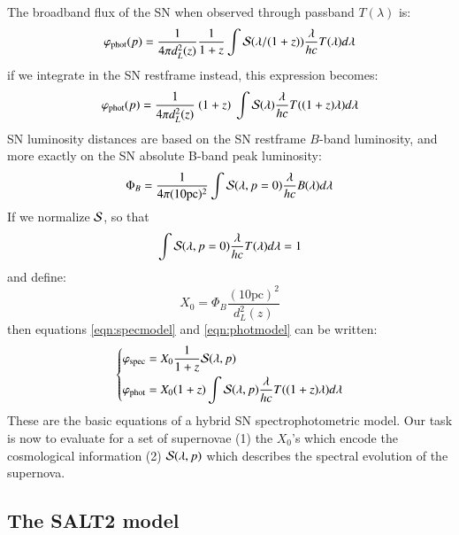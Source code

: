\documentclass{aa}
\begin{document}
The broadband flux of the SN when observed through passband
$T(\lambda)$ is:
\begin{equation}
  \varphi_{\mathrm{phot}}(p) = \frac{1}{4\pi d_L^2(z)} \frac{1}{1+z} \int {\cal S}(\lambda/(1+z)) \frac{\lambda}{hc} T(\lambda) d\lambda
\end{equation}
if we integrate in the SN restframe instead, this expression becomes:
\begin{equation}
  \varphi_{\mathrm{phot}}(p) = \frac{1}{4\pi d_L^2(z)}\ (1+z)\ \int {\cal S}(\lambda) \frac{\lambda}{hc} T((1+z)\lambda) d\lambda
    \label{eqn:photmodel}
\end{equation}
SN luminosity distances are based on the SN restframe $B$-band
luminosity, and more exactly on the SN absolute B-band peak
luminosity:
\begin{equation}
  \Phi_B = \frac{1}{4\pi (10\mathrm{pc})^2} \int {\cal S}(\lambda, p=0) \frac{\lambda}{hc} B(\lambda) d\lambda
\end{equation}
If we normalize $\cal S$, so that
\begin{equation}
  \int {\cal S}(\lambda, p=0) \frac{\lambda}{hc} T(\lambda) d\lambda = 1
\end{equation}
and define:
\begin{equation}
  X_0 = \Phi_B \frac{(10\mathrm{pc})^2}{d_L^2(z)}
\end{equation}
then equations \ref{eqn:specmodel} and \ref{eqn:photmodel} can be written:
\begin{equation}
  \left \{
  \begin{aligned}
    \varphi_{\mathrm{spec}} & = X_0 \frac{1}{1+z} {\cal S}(\lambda, p) \\
    \varphi_{\mathrm{phot}} & = X_0 (1+z) \int {\cal S}(\lambda, p) \frac{\lambda}{hc} T((1+z)\lambda) d\lambda\\    
  \end{aligned}\right.
\end{equation}
These are the basic equations of a hybrid SN spectrophotometric
model. Our task is now to evaluate for a set of supernovae (1) the
$X_0$'s which encode the cosmological information (2) ${\cal
  S}(\lambda,p)$ which describes the spectral evolution of the
supernova.


\subsection{The SALT2 model}
\end{document}

